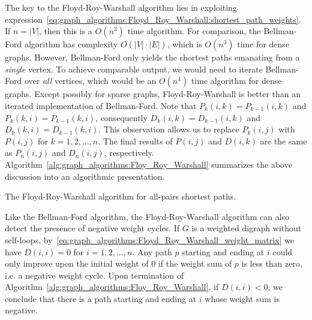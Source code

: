The key to the Floyd-Roy-Warshall
algorithm lies in exploiting
expression~\eqref{eq:graph_algorithms:Floyd_Roy_Warshall:shortest_path_weights}.
If $n = |V|$, then this is a $O(n^3)$ time algorithm. For
comparison, the Bellman-Ford algorithm
has complexity $O(|V| \cdot |E|)$, which is $O(n^3)$ time for dense
graphs. However, Bellman-Ford only yields the
shortest paths emanating from a \emph{single} vertex. To achieve
comparable output, we would need to iterate Bellman-Ford over
\emph{all} vertices, which would be an  $O(n^4)$ time algorithm for
dense graphs. Except possibly for sparse
graphs,
Floyd-Roy-Warshall is better than
an iterated implementation of Bellman-Ford. Note that
$P_k(i,k) = P_{k-1}(i,k)$ and $P_k(k,i) = P_{k-1}(k,i)$, consequently
$D_k(i,k) = D_{k-1}(i,k)$ and $D_k(k,i) = D_{k-1}(k,i)$. This
observation allows us to replace $P_k(i,j)$ with $P(i,j)$ for
$k = 1, 2, \dots, n$. The final results of $P(i,j)$ and $D(i,k)$ are
the same as $P_n(i,j)$ and $D_n(i,j)$,
respectively. Algorithm~\ref{alg:graph_algorithms:Floy_Roy_Warshall}
summarizes the above discussion into an algorithmic presentation.

\begin{algorithm}[!htpb]

\caption{The Floyd-Roy-Warshall algorithm for all-pairs shortest paths.}
\label{alg:graph_algorithms:Floy_Roy_Warshall}
\end{algorithm}

Like the Bellman-Ford algorithm, the
Floyd-Roy-Warshall algorithm can
also detect the presence of negative weight
cycles. If $G$ is a weighted digraph without
self-loops,
by~\eqref{eq:graph_algorithms:Floyd_Roy_Warshall_weight_matrix} we
have $D(i,i) = 0$ for $i = 1, 2, \dots, n$. Any path $p$ starting and
ending at $i$ could only improve upon the initial weight of $0$ if the
weight sum of $p$ is less than zero, i.e. a negative weight
cycle. Upon termination of
Algorithm~\ref{alg:graph_algorithms:Floy_Roy_Warshall}, if $D(i,i) <
0$, we conclude that there is a path starting and ending at $i$ whose
weight sum is negative.

